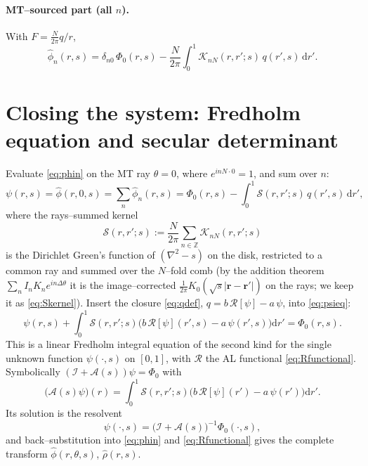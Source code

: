 \documentclass{article}
\newcommand{\rd}{\mathrm{d}}
\begin{document}
\paragraph{MT--sourced part (all $n$).} With $F=\frac{N}{2\pi}q/r$,
\begin{equation}
\widehat\phi_n(r,s)=\delta_{n0}\,\Phi_0(r,s)
-\frac{N}{2\pi}\int_0^1 \mathcal K_{nN}(r,r';s)\,q(r',s)\,\rd r' .
\label{eq:phin}
\end{equation}

\section{Closing the system: Fredholm equation and secular determinant}

Evaluate \eqref{eq:phin} on the MT ray $\theta=0$, where $e^{inN\cdot 0}=1$, and
sum over $n$:
\begin{equation}
\psi(r,s)=\widehat\phi(r,0,s)=\sum_n\widehat\phi_n(r,s)
=\Phi_0(r,s)-\int_0^1 \mathcal S(r,r';s)\,q(r',s)\,\rd r',
\label{eq:psieq}
\end{equation}
where the rays--summed kernel
\begin{equation}
\mathcal S(r,r';s):=\frac{N}{2\pi}\sum_{n\in\mathbb Z}\mathcal K_{nN}(r,r';s)
\label{eq:Skernel}
\end{equation}
is the Dirichlet Green's function of $(\nabla^2-s)$ on the disk, restricted to a
common ray and summed over the $N$--fold comb (by the addition theorem
$\sum_n I_n K_n e^{in\Delta\theta}$ it is the image--corrected
$\tfrac{1}{2\pi}K_0(\sqrt s|\mathbf r-\mathbf r'|)$ on the rays; we keep it as
\eqref{eq:Skernel}). Insert the closure \eqref{eq:qdef},
$q=b\,\mathcal R[\psi]-a\,\psi$, into \eqref{eq:psieq}:
\begin{equation}
\boxed{\;
\psi(r,s)+\int_0^1 \mathcal S(r,r';s)
\bigl(b\,\mathcal R[\psi](r',s)-a\,\psi(r',s)\bigr)\rd r'
=\Phi_0(r,s).
\;}
\label{eq:fredholm}
\end{equation}
This is a linear Fredholm integral equation of the second kind for the single
unknown function $\psi(\cdot,s)$ on $[0,1]$, with $\mathcal R$ the AL functional
\eqref{eq:Rfunctional}. Symbolically $(\mathcal I+\mathcal A(s))\psi=\Phi_0$ with
\begin{equation}
\bigl(\mathcal A(s)\psi\bigr)(r)=\int_0^1\mathcal S(r,r';s)
\bigl(b\,\mathcal R[\psi](r')-a\,\psi(r')\bigr)\rd r' .
\end{equation}
Its solution is the resolvent
\begin{equation}
\psi(\cdot,s)=\bigl(\mathcal I+\mathcal A(s)\bigr)^{-1}\Phi_0(\cdot,s),
\label{eq:psisol}
\end{equation}
and back--substitution into \eqref{eq:phin} and \eqref{eq:Rfunctional} gives the
complete transform $\widehat\phi(r,\theta,s)$, $\widehat\rho(r,s)$.
\end{document}
